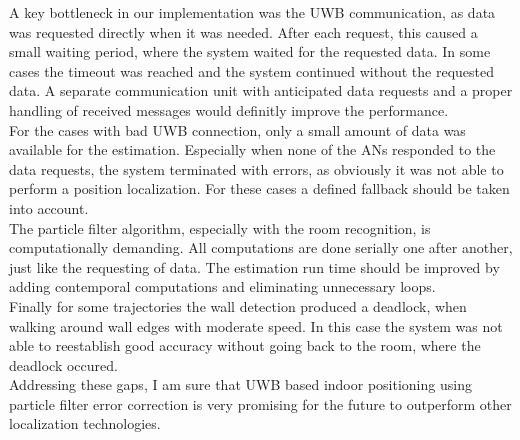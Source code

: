 A key bottleneck in our implementation was the UWB communication, as data was requested directly when it was needed. After each request, this caused a small waiting period, where the system waited for the requested data. In some cases the timeout was reached and the system continued without the requested data. A separate communication unit with anticipated data requests and a proper handling of received messages would definitly improve the performance. \\
For the cases with bad UWB connection, only a small amount of data was available for the estimation. Especially when none of the ANs responded to the data requests, the system terminated with errors, as obviously it was not able to perform a position localization. For these cases a defined fallback should be taken into account.\\
The particle filter algorithm, especially with the room recognition, is computationally demanding. All computations are done serially one after another, just like the requesting of data. The estimation run time should be improved by adding contemporal computations and eliminating unnecessary loops.\\
Finally for some trajectories the wall detection produced a deadlock, when walking around wall edges with moderate speed. In this case the system was not able to reestablish good accuracy without going back to the room, where the deadlock occured.\\

Addressing these gaps, I am sure that UWB based indoor positioning using particle filter error correction is very promising for the future to outperform other localization technologies.